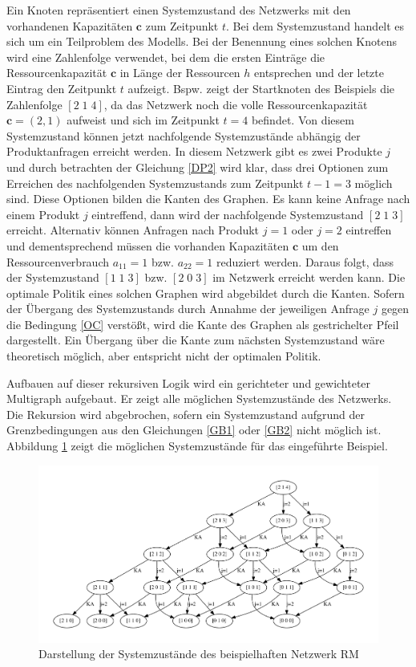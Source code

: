 Ein Knoten repräsentiert einen Systemzustand des Netzwerks mit den vorhandenen Kapazitäten $\textbf{c}$ zum Zeitpunkt $t$. Bei dem Systemzustand handelt es sich um ein Teilproblem des Modells. Bei der Benennung eines solchen Knotens wird eine Zahlenfolge verwendet, bei dem die ersten Einträge die Ressourcenkapazität $\textbf{c}$ in Länge der Ressourcen $h$ entsprechen und der letzte Eintrag den Zeitpunkt $t$ aufzeigt. Bspw. zeigt der Startknoten des Beispiels die Zahlenfolge $[2\;1\;4]$, da das Netzwerk noch die volle Ressourcenkapazität $\textbf{c}=(2,1)$ aufweist und sich im Zeitpunkt $t=4$ befindet. Von diesem Systemzustand können jetzt nachfolgende Systemzustände abhängig der Produktanfragen erreicht werden. In diesem Netzwerk gibt es zwei Produkte $j$ und durch betrachten der Gleichung \eqref{DP2} wird klar, dass drei Optionen zum Erreichen des nachfolgenden Systemzustands zum Zeitpunkt $t-1=3$ möglich sind. Diese Optionen bilden die Kanten des Graphen. Es kann keine Anfrage nach einem Produkt $j$ eintreffend, dann wird der nachfolgende Systemzustand $[2\;1\;3]$ erreicht. Alternativ können Anfragen nach Produkt $j=1$ oder $j=2$ eintreffen und dementsprechend müssen die vorhanden Kapazitäten $\textbf{c}$ um den Ressourcenverbrauch $a_{11}=1$ bzw. $a_{22}=1$ reduziert werden. Daraus folgt, dass der Systemzustand $[1\;1\;3]$ bzw. $[2\;0\;3]$ im Netzwerk erreicht werden kann. Die optimale Politik eines solchen Graphen wird abgebildet durch die Kanten. Sofern der Übergang des Systemzustands durch Annahme der jeweiligen Anfrage $j$ gegen die Bedingung \eqref{OC} verstößt, wird die Kante des Graphen als gestrichelter Pfeil dargestellt. Ein Übergang über die Kante zum nächsten Systemzustand wäre theoretisch möglich, aber entspricht nicht der optimalen Politik.

Aufbauen auf dieser rekursiven Logik wird ein gerichteter und gewichteter Multigraph aufgebaut. Er zeigt alle möglichen Systemzustände des Netzwerks. Die Rekursion wird abgebrochen, sofern ein Systemzustand aufgrund der Grenzbedingungen aus den Gleichungen \eqref{GB1} oder \eqref{GB2} nicht möglich ist. Abbildung \ref{B1} zeigt die möglichen Systemzustände für das eingeführte Beispiel.
\begin{figure}[h!]
  \begin{center}
    \includegraphics[width=150mm]{Bilder/Beispiel1.pdf}
    \caption{Darstellung der Systemzustände des beispielhaften Netzwerk RM}  \label{B1}
  \end{center}
\end{figure}

